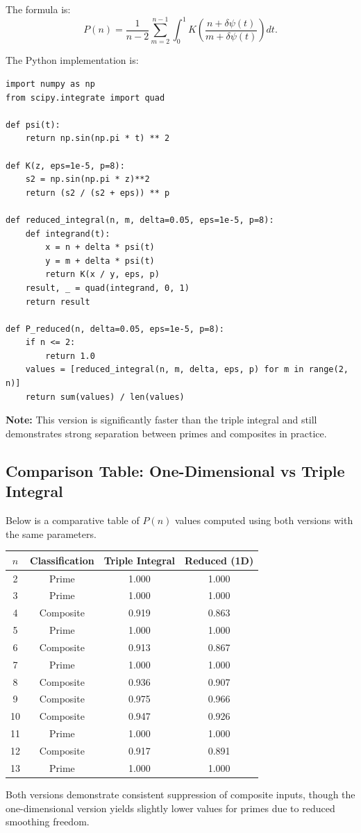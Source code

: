 \documentclass[12pt]{article}
\theoremstyle{definition}
\theoremstyle{plain}
\theoremstyle{remark}
\begin{document}
The formula is:
\[
P(n) = \frac{1}{n - 2} \sum_{m = 2}^{n - 1}
\int_0^1 K\left( \frac{n + \delta \psi(t)}{m + \delta \psi(t)} \right) dt.
\]

The Python implementation is:

\begin{verbatim}
import numpy as np
from scipy.integrate import quad

def psi(t):
    return np.sin(np.pi * t) ** 2

def K(z, eps=1e-5, p=8):
    s2 = np.sin(np.pi * z)**2
    return (s2 / (s2 + eps)) ** p

def reduced_integral(n, m, delta=0.05, eps=1e-5, p=8):
    def integrand(t):
        x = n + delta * psi(t)
        y = m + delta * psi(t)
        return K(x / y, eps, p)
    result, _ = quad(integrand, 0, 1)
    return result

def P_reduced(n, delta=0.05, eps=1e-5, p=8):
    if n <= 2:
        return 1.0
    values = [reduced_integral(n, m, delta, eps, p) for m in range(2, n)]
    return sum(values) / len(values)
\end{verbatim}

\textbf{Note:} This version is significantly faster than the triple integral and still demonstrates strong separation between primes and composites in practice.

\subsection{Comparison Table: One-Dimensional vs Triple Integral}

Below is a comparative table of \( P(n) \) values computed using both versions with the same parameters.

\begin{center}
\begin{tabular}{|c|c|c|c|}
\hline
\( n \) & Classification & Triple Integral & Reduced (1D) \\
\hline
2  & Prime     & 1.000 & 1.000 \\
3  & Prime     & 1.000 & 1.000 \\
4  & Composite & 0.919 & 0.863 \\
5  & Prime     & 1.000 & 1.000 \\
6  & Composite & 0.913 & 0.867 \\
7  & Prime     & 1.000 & 1.000 \\
8  & Composite & 0.936 & 0.907 \\
9  & Composite & 0.975 & 0.966 \\
10 & Composite & 0.947 & 0.926 \\
11 & Prime     & 1.000 & 1.000 \\
12 & Composite & 0.917 & 0.891 \\
13 & Prime     & 1.000 & 1.000 \\
\hline
\end{tabular}
\end{center}

Both versions demonstrate consistent suppression of composite inputs, though the one-dimensional version yields slightly lower values for primes due to reduced smoothing freedom.
\end{document}
